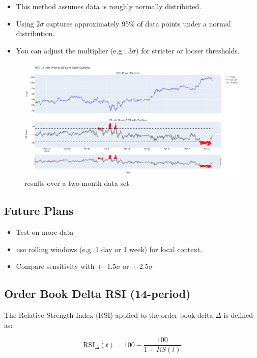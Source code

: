 \documentclass[12pt]{article}
\begin{document}
\begin{itemize}
    \item This method assumes data is roughly normally distributed.
    \item Using $2\sigma$ captures approximately 95\% of data points under a normal distribution.
    \item You can adjust the multiplier (e.g., $3\sigma$) for stricter or looser thresholds.
\end{itemize}


\begin{figure}
    \centering
    \includegraphics[width=1\textwidth]{imgs/ResultsOfSTDoutlierDecection.png}
    \caption{results over a two month data set}
\end{figure}


\subsection*{Future Plans}

\begin{itemize}
    \item Test on more data
    \item use rolling windows (e.g. 1 day or 1 week) for local context.
    \item Compare sensitivity with +- 1.5$\sigma$ or +-2.5$\sigma$
\end{itemize}

\newpage

\subsection*{Order Book Delta RSI (14-period)}

The Relative Strength Index (RSI) applied to the order book delta $\Delta$ is defined as:

\[
\text{RSI}_{\Delta}(t) = 100 - \frac{100}{1 + RS(t)}
\]
\end{document}
